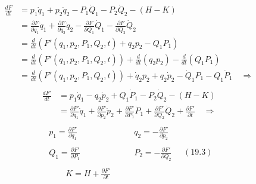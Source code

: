 \documentclass[a4paper]{article}
\begin{document}
\begin{answer}[Punto 19]
        \begin{align*}
            \frac{dF}{dt}  &=p_1 \dot q_1 + p_2 \dot q_2 - P_1\dot Q_1- P_2 \dot Q_2 - (H - K)\\
            &= \frac{\partial F}{\partial q_1} \dot q_1 + \frac{\partial F}{\partial q_2} \dot q_2- \frac{\partial F}{\partial Q_1}\dot Q_1- \frac{\partial F}{\partial Q_2} \dot Q_2\\
            &= \frac d{dt}\left(F'(q_1, p_2, P_1, Q_2, t) + q_2 p_2 - Q_1 P_1 \right)\\
            &= \frac d{dt}\left(F'(q_1, p_2, P_1, Q_2, t) \right) + \frac d{dt}\left(q_2 p_2 \right) - \frac d{dt}\left(Q_1 P_1 \right)\\
            &= \frac d{dt}\left(F'(q_1, p_2, P_1, Q_2, t) \right) + \dot q_2 p_2 + q_2 \dot p_2 - \dot Q_1 P_1 - Q_1 \dot P_1 \quad \Rightarrow\\
        \end{align*}
        \begin{align*}
            \frac {dF'}{dt} &= p_1\dot q_1 - q_2 \dot p_2 + Q_1\dot P_1 - P_2\dot Q_2 - (H-K)\\
            &= \frac{\partial F'}{\partial q_1} \dot q_1 + \frac{\partial F'}{\partial p_2} \dot p_2 + \frac{\partial F'}{\partial P_1}\dot P_1+\frac{\partial F'}{\partial Q_2} \dot Q_2 + \frac{\partial F'}{\partial t} \quad \Rightarrow\\
        \end{align*}
        \begin{equation*}
            \begin{align*}
                p_1 = \frac{\partial F'}{\partial q_1} & \qquad q_2 = -\frac{\partial F'}{\partial p_2} \\\\
                Q_1 = \frac{\partial F'}{\partial P_1} & \qquad P_2= -\frac{\partial F'}{\partial Q_2} \\\\
                \qquad K = H+\frac{\partial F'}{\partial t} 
            \end{align*} \quad (19.3)
        \end{equation*}
      

\end{answer}
\end{document}
